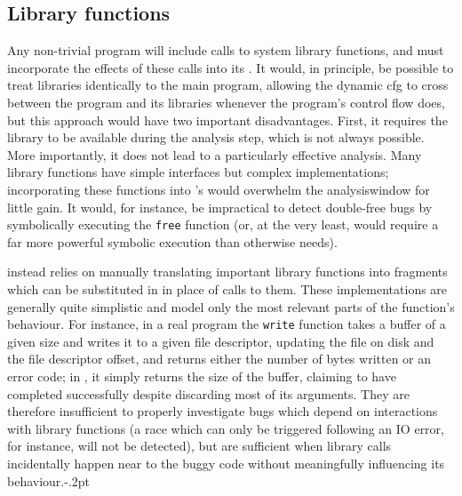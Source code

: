\subsection{Library functions}
\label{sect:derive:library_functions}

Any non-trivial program will include calls to system library
functions, and {\technique} must incorporate the effects of these
calls into its {\StateMachines}.  It would, in principle, be possible
to treat libraries identically to the main program, allowing the
\gls{dynamic cfg} to cross between the program and its libraries
whenever the program's control flow does, but this approach would have
two important disadvantages.  First, it requires the library to be
available during the analysis step, which is not always possible.
More importantly, it does not lead to a particularly effective
analysis.  Many library functions have simple interfaces but complex
implementations; incorporating these functions into {\technique}'s
{\StateMachines} would overwhelm the \gls{analysiswindow} for little
gain.  It would, for instance, be impractical to detect double-free
bugs by symbolically executing the \texttt{free} function (or, at the
very least, would require a far more powerful symbolic execution than
{\technique} otherwise needs).

{\Technique} instead relies on manually translating important library
functions into {\StateMachine} fragments which can be substituted in
in place of calls to them.  These implementations are generally quite
simplistic and model only the most relevant parts of the function's
behaviour.  For instance, in a real program the \texttt{write}
function takes a buffer of a given size and writes it to a given file
descriptor, updating the file on disk and the file descriptor offset,
and returns either the number of bytes written or an error code; in
{\atechnique} {\StateMachine}, it simply returns the size of the
buffer, claiming to have completed successfully despite discarding
most of its arguments.  They are therefore insufficient to properly
investigate bugs which depend on interactions with library functions
(a race which can only be triggered following an IO error, for
instance, will not be detected), but are sufficient when library calls
incidentally happen near to the buggy code without meaningfully
influencing its behaviour.\kern-.2pt

